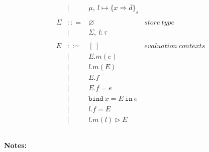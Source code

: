 \documentclass{llncs}
\newcommand{\keywadj}[1]{\mathtt{#1}}
\newcommand{\keyw}[1]{\keywadj{#1}~}
\begin{document}
\[\begin{array}{lll}
\begin{array}{lllr}
& | & \mu,~l \mapsto \{ x \Rightarrow \overline{d} \}_{s}\\
&&\\
\Sigma & :: = & \varnothing & store~type\\
& | & \Sigma,~l : \tau\\
&&\\
E & ::= & [~] & evaluation~ contexts\\
  & |   & E.m(e)\\
  & |   & l.m(E)\\
  & |   & E.f \\
  & |   & E.f = e \\
  & |   & \keyw{bind} x = E~\keyw{in} e \\
  & |   & l.f = E \\
  & |   & l.m(l) \rhd E \\
&&\\
\end{array}
\end{array}
\]

\noindent \textbf{Notes:}
\end{document}
